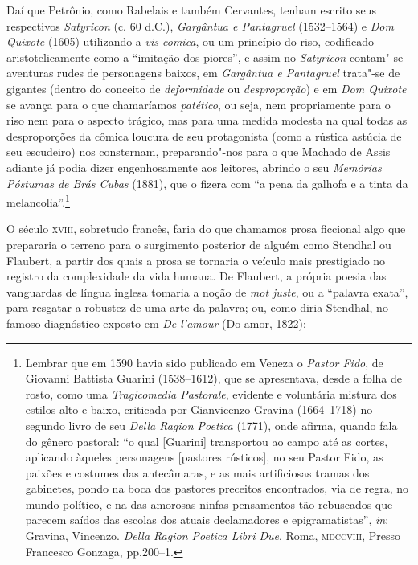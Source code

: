 Daí que Petrônio, como Rabelais e também Cervantes, tenham escrito seus
respectivos \emph{Satyricon} (c. 60 d.C.), \emph{Gargântua e Pantagruel}
(1532--1564) e \emph{Dom Quixote} (1605) utilizando a \emph{vis comica},
ou um princípio do riso, codificado aristotelicamente como a ``imitação
dos piores'', e assim no \emph{Satyricon} contam"-se aventuras rudes de
personagens baixos, em \emph{Gargântua e Pantagruel} trata"-se de
gigantes (dentro do conceito de \emph{deformidade} ou
\emph{desproporção}) e em \emph{Dom Quixote} se avança para o que
chamaríamos \emph{patético}, ou seja, nem propriamente para o riso nem
para o aspecto trágico, mas para uma medida modesta na qual todas as
desproporções da cômica loucura de seu protagonista (como a rústica
astúcia de seu escudeiro) nos consternam, preparando"-nos para o que
Machado de Assis adiante já podia dizer engenhosamente aos leitores,
abrindo o seu \emph{Memórias Póstumas de Brás Cubas} (1881), que o
fizera com ``a pena da galhofa e a tinta da melancolia''.\footnote{Lembrar
  que em 1590 havia sido publicado em Veneza o \emph{Pastor Fido}, de
  Giovanni Battista Guarini (1538--1612), que se apresentava, desde a
  folha de rosto, como uma \emph{Tragicomedia Pastorale}, evidente e
  voluntária mistura dos estilos alto e baixo, criticada por Gianvicenzo
  Gravina (1664--1718) no segundo livro de seu \emph{Della Ragion
  Poetica} (1771), onde afirma, quando fala do gênero pastoral: ``o qual
  {[}Guarini{]} transportou ao campo até as cortes, aplicando àqueles
  personagens {[}pastores rústicos{]}, no seu Pastor Fido, as paixões e
  costumes das antecâmaras, e as mais artificiosas tramas dos gabinetes,
  pondo na boca dos pastores preceitos encontrados, via de regra, no
  mundo político, e na das amorosas ninfas pensamentos tão rebuscados
  que parecem saídos das escolas dos atuais declamadores e
  epigramatistas'', \emph{in}: Gravina, Vincenzo. \emph{Della Ragion
  Poetica Libri Due}, Roma, \textsc{mdccviii}, Presso Francesco Gonzaga,
  pp.200--1.}

O século \textsc{xviii}, sobretudo francês, faria do que chamamos prosa ficcional
algo que prepararia o terreno para o surgimento posterior de alguém como
Stendhal ou Flaubert, a partir dos quais a prosa se tornaria o veículo
mais prestigiado no registro da complexidade da vida humana. De
Flaubert, a própria poesia das vanguardas de língua inglesa tomaria a
noção de \emph{mot juste}, ou a ``palavra exata'', para resgatar a
robustez de uma arte da palavra; ou, como diria Stendhal, no famoso
diagnóstico exposto em \emph{De l'amour} (Do amor, 1822):

